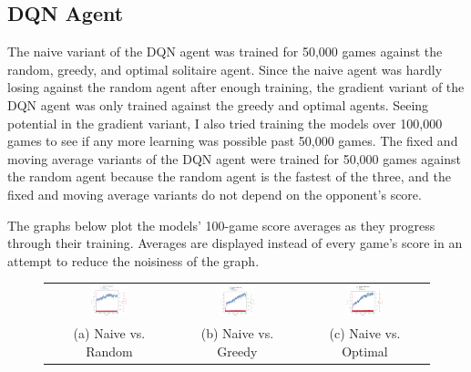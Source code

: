 \documentclass[12pt]{article}
\begin{document}
\subsection{DQN Agent}
The naive variant of the DQN agent was trained for 50,000 games against the random, greedy, and optimal solitaire agent. Since the naive agent was hardly losing against the random agent after enough training, the gradient variant of the DQN agent was only trained against the greedy and optimal agents. Seeing potential in the gradient variant, I also tried training the models over 100,000 games to see if any more learning was possible past 50,000 games. The fixed and moving average variants of the DQN agent were trained for 50,000 games against the random agent because the random agent is the fastest of the three, and the fixed and moving average variants do not depend on the opponent's score.

The graphs below plot the models' 100-game score averages as they progress through their training. Averages are displayed instead of every game's score in an attempt to reduce the noisiness of the graph.

\begin{figure}[H]
    \begin{tabular}{ccc}
        \includegraphics[width=0.3\textwidth]{naive_random} & 
        \includegraphics[width=0.3\textwidth]{naive_greedy} & 
        \includegraphics[width=0.3\textwidth]{naive_optimal} \\
        (a) Naive vs. Random &
        (b) Naive vs. Greedy &
        (c) Naive vs. Optimal
    \end{tabular}
\end{figure}
\end{document}
